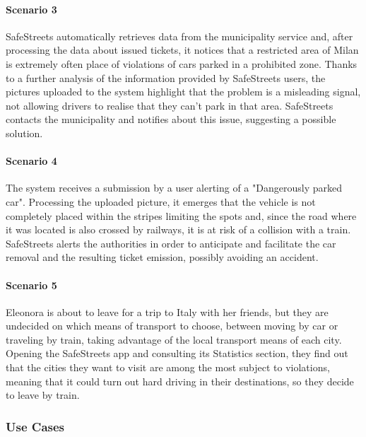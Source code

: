 \paragraph{Scenario 3}
\label{scenario:3}
	SafeStreets automatically retrieves data from the municipality service and, after processing the data about issued tickets, it notices that a restricted area of Milan is extremely often place of violations of cars parked in a prohibited zone. Thanks to a further analysis of the information provided by SafeStreets users, the pictures uploaded to the system highlight that the problem is a misleading signal, not allowing drivers to realise that they can't park in that area. SafeStreets contacts the municipality and notifies about this issue, suggesting a possible solution.

\paragraph{Scenario 4}
\label{scenario:4}
	The system receives a submission by a user alerting of a "Dangerously parked car". Processing the uploaded picture, it emerges that the vehicle is not completely placed within the stripes limiting the spots and, since the road where it was located is also crossed by railways, it is at risk of a collision with a train. SafeStreets alerts the authorities in order to anticipate and facilitate the car removal and the resulting ticket emission, possibly avoiding an accident.	
	
\paragraph{Scenario 5}
\label{scenario:5}
	Eleonora is about to leave for a trip to Italy with her friends, but they are undecided on which means of transport to choose, between moving by car or traveling by train, taking advantage of the local transport means of each city. Opening the SafeStreets app and consulting its Statistics section, they find out that the cities they want to visit are among the most subject to violations, meaning that it could turn out hard driving in their destinations, so they decide to leave by train.
	
\clearpage

\subsubsection{Use Cases}

\clearpage


